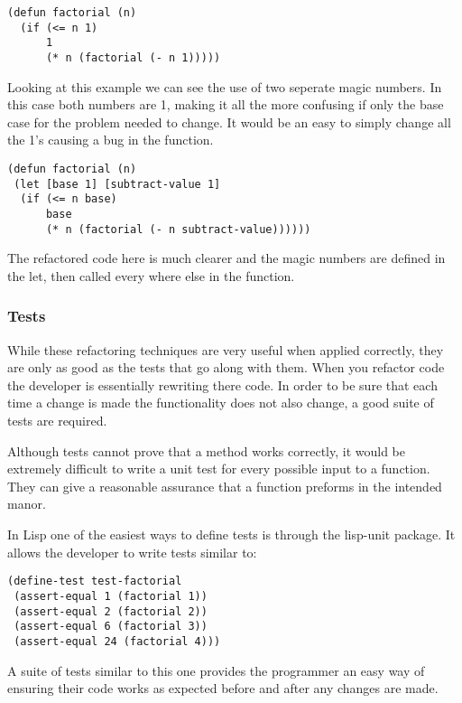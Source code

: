 \begin{verbatim}
(defun factorial (n)
  (if (<= n 1)
      1
      (* n (factorial (- n 1)))))
\end{verbatim}
 
Looking at this example we can see the use of two seperate magic numbers. In this case both numbers are 1, making it all the more confusing if only the base case for the problem needed to change. It would be an easy to simply change all the 1’s causing a bug in the function.

\begin{verbatim} 
(defun factorial (n)
 (let [base 1] [subtract-value 1]
  (if (<= n base)
      base
      (* n (factorial (- n subtract-value))))))
\end{verbatim}
 
The refactored code here is much clearer and the magic numbers are defined in the let, then called every where else in the function.
 
\subsubsection{Tests}
 
While these refactoring techniques are very useful when applied correctly, they are only as good as the tests that go along with them. When you refactor code the developer is essentially rewriting there code. In order to be sure that each time a change is made the functionality does not also change, a good suite of tests are required\cite{lisprefactoring}. 
 
Although tests cannot prove that a method works correctly, it would be extremely difficult to write a unit test for every possible input to a function. They can give a reasonable assurance that a function preforms in the intended manor. 
 
In Lisp one of the easiest ways to define tests is through the lisp-unit package. It allows the developer to write tests similar to:
 
\begin{verbatim}
(define-test test-factorial
 (assert-equal 1 (factorial 1))
 (assert-equal 2 (factorial 2))
 (assert-equal 6 (factorial 3))
 (assert-equal 24 (factorial 4)))
\end{verbatim}
 
A suite of tests similar to this one provides the programmer an easy way of ensuring their code works as expected before and after any changes are made. 
 
